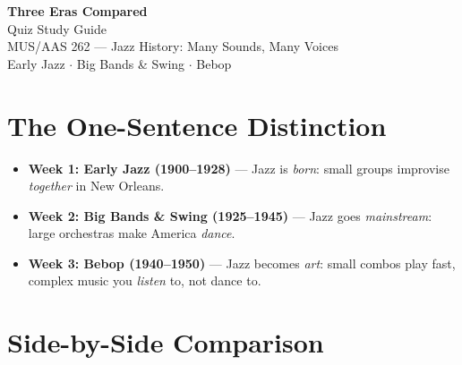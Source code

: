 \documentclass[11pt,letterpaper]{article}
\begin{document}
\begin{center}
{\Huge\bfseries\textcolor{headerblue}{Three Eras Compared}}\\[0.3em]
{\Large Quiz Study Guide}\\[0.5em]
{\large MUS/AAS 262 --- Jazz History: Many Sounds, Many Voices}\\[0.3em]
{\normalsize Early Jazz $\cdot$ Big Bands \& Swing $\cdot$ Bebop}
\end{center}

\vspace{1em}

\section{The One-Sentence Distinction}

\begin{itemize}[leftmargin=1.5em]
  \item \textbf{\textcolor{week1color}{Week 1: Early Jazz (1900--1928)}} --- Jazz is \emph{born}: small groups improvise \emph{together} in New Orleans.
  \item \textbf{\textcolor{week2color}{Week 2: Big Bands \& Swing (1925--1945)}} --- Jazz goes \emph{mainstream}: large orchestras make America \emph{dance}.
  \item \textbf{\textcolor{week3color}{Week 3: Bebop (1940--1950)}} --- Jazz becomes \emph{art}: small combos play fast, complex music you \emph{listen} to, not dance to.
\end{itemize}

\section{Side-by-Side Comparison}
\end{document}
